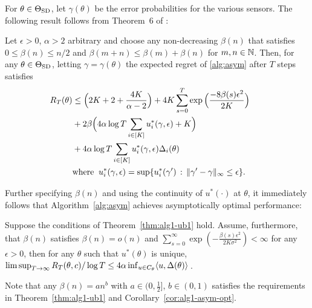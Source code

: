 \newcommand{\gap}{d}
\newcommand{\norm}[1]{\|#1\|}
For $\theta \in \Theta_{\mathrm{SD}}$, let $\gamma(\theta)$ be the error probabilities for the various sensors.
The following result follows from Theorem~6 of \cite{WGySz:NIPS15}:
\begin{thm} \label{thm:ftregret}
Let $\epsilon>0$, $\alpha>2$ arbitrary and choose any non-decreasing $\beta(n)$ that satisfies $0\le \beta(n)\le n/2$ and $\beta(m+n)\le \beta(m)+\beta(n)$ for $m,n\in \mathbb{N}$.
Then, 
for any
$\theta\in \Theta_{\mathrm{SD}}$, letting $\gamma = \gamma(\theta)$
the expected regret of \cref{alg:asym} after $T$ steps satisfies 
\begin{align*}
R_T(\theta)
  &\le  \Big( 2K+2+\frac{4K}{\alpha-2} \Big) 
  +  4K\sum_{s=0}^T \exp{\Big( \frac{-8\beta(s)\epsilon^2}{2K} \Big)}~~~~~ \\
 &+ 2 \beta\Big( 4\alpha\log T\sum_{i\in \iset{K}} u_i^*(\gamma,\epsilon)+K \Big)\\
 & +  4\alpha\log T \sum_{i\in \iset{K}} u_i^*(\gamma,\epsilon)\Delta_i(\theta) \\
 &\mbox{where}  \;\; u_i^*(\gamma,\epsilon) = \sup\{u_i^*(\gamma')\,:\, \norm{\gamma'-\gamma}_{\infty}\le \epsilon \}.
\end{align*}
\label{thm:alg1-ub1}
\end{thm}  
Further specifying $\beta(n)$ and using the continuity of $u^*(\cdot)$ at $\theta$, it immediately follows that Algorithm~\ref{alg:asym} achieves asymptotically optimal performance: 
\begin{cor}
\label{cor:alg1-asym-opt}
 Suppose the conditions of Theorem~\ref{thm:alg1-ub1} hold. Assume, furthermore, that $\beta(n)$ satisfies $\beta(n) = o(n)$ and $\sum_{s=0}^\infty \exp \left( -\frac{\beta(s)\epsilon^2}{2K\sigma^2} \right)<\infty$ for any $\epsilon>0$, then for any $\theta$ such that $u^*(\theta)$ is unique, 
$
\limsup_{T\rightarrow \infty} R_T(\theta,c)/\log T \le 4\alpha \inf_{u\in C_\theta} \langle u,\Delta(\theta) \rangle\,$.
\end{cor}
Note that any $\beta(n) = an^b$ with $a\in (0,\frac{1}{2}]$, $b\in (0,1)$ satisfies the requirements in Theorem~\ref{thm:alg1-ub1} and Corollary~\ref{cor:alg1-asym-opt}.




